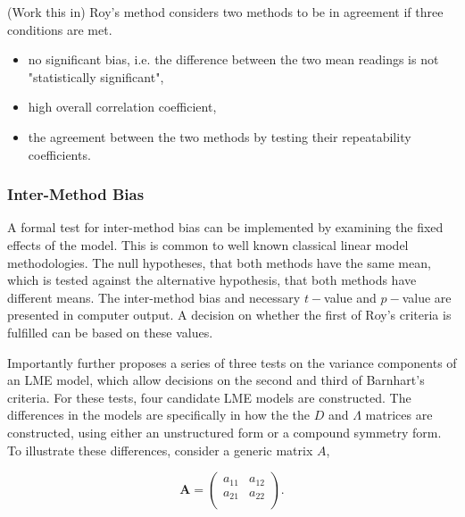 \documentclass[12pt, a4paper]{article}
\theoremstyle{plain}
\theoremstyle{definition}
\theoremstyle{remark}
\begin{document}
	(Work this in)	Roy's method considers two methods to be in agreement if three
		conditions are met.
		
		\begin{itemize}
			\item no significant bias, i.e. the difference between the two
			mean readings is not "statistically significant",
			
			\item high overall correlation coefficient,
			
			\item the agreement between the two methods by testing their
			repeatability coefficients.
			
		\end{itemize}	
	\subsubsection{Inter-Method Bias}

		
	A formal test for inter-method bias can be implemented by examining the fixed effects of the model. This is common to well known classical linear model methodologies. The null hypotheses, that both methods have the same mean, which is tested against the alternative hypothesis, that both methods have different means.
	The inter-method bias and necessary $t-$value and $p-$value are presented in computer output. A decision on whether the first of Roy's criteria is fulfilled can be based on these values.
	
	Importantly \citet{ARoy2009} further proposes a series of three tests on the variance components of an LME model, which allow decisions on the second and third of Barnhart's criteria. For these tests, four candidate LME models are constructed. The differences in the models are specifically in how the the $D$ and $\Lambda$ matrices are constructed, using either an unstructured form or a compound symmetry form. To illustrate these differences, consider a generic matrix $A$,
	
	\[
	\boldsymbol{A} = \left( \begin{array}{cc}
	a_{11} & a_{12}  \\
	a_{21} & a_{22}  \\
	\end{array}\right).
	\]
	
\end{document}
